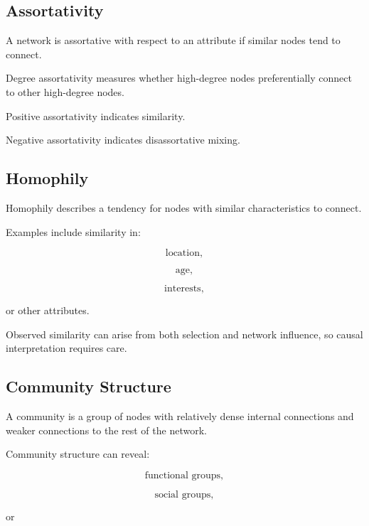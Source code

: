 \subsection{Assortativity}
\label{subsec:network-assortativity}

A network is assortative with respect to an attribute if similar nodes tend
to connect.

Degree assortativity measures whether high-degree nodes preferentially
connect to other high-degree nodes.

Positive assortativity indicates similarity.

Negative assortativity indicates disassortative mixing.

\subsection{Homophily}
\label{subsec:network-homophily}

Homophily describes a tendency for nodes with similar characteristics to
connect.

Examples include similarity in:

\[
\boxed{
\text{location},
}
\]

\[
\boxed{
\text{age},
}
\]

\[
\boxed{
\text{interests},
}
\]

or other attributes.

Observed similarity can arise from both selection and network influence, so
causal interpretation requires care.

\subsection{Community Structure}
\label{subsec:community-structure}

A community is a group of nodes with relatively dense internal connections
and weaker connections to the rest of the network.

Community structure can reveal:

\[
\boxed{
\text{functional groups},
}
\]

\[
\boxed{
\text{social groups},
}
\]

or

